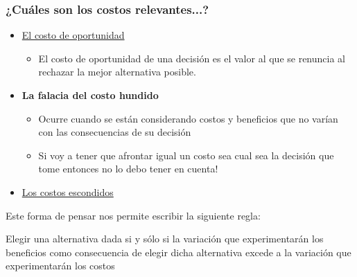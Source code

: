 \documentclass{beamer}
\begin{document}
\begin{frame}
\frametitle{¿Cuáles son los costos relevantes...?}
\begin{itemize}
    \item  \href{https://econ.video/2017/08/28/the-simpsons-opportunity-cost-of-lines/}{El costo de oportunidad}
    \begin{itemize}
        \item El costo de oportunidad de una decisión es el valor al que se renuncia al rechazar la mejor alternativa posible.
    \end{itemize}
    \vspace{2mm}
    \item \textbf{La falacia del costo hundido}  
    \begin{itemize}
        \item Ocurre cuando se están considerando costos y beneficios que no varían con las consecuencias de su decisión
        \item Si voy a tener que afrontar igual un costo sea cual sea la decisión que tome entonces no lo debo tener en cuenta!
    \end{itemize}
    \vspace{2mm}
    \item \href{https://www.goodfood.com.au/eat-out/good-food-guides/the-surprising-costs-of-running-a-restaurant-20180327-h0y23c}{Los costos escondidos} 
    \vspace{2mm}
\end{itemize}
Este forma de pensar nos permite escribir la siguiente regla:
\begin{boxA}
    Elegir una alternativa dada si y sólo si la variación que experimentarán los beneficios como consecuencia de elegir dicha alternativa excede a la variación que experimentarán los costos 
\end{boxA}

\end{frame}
\end{document}
